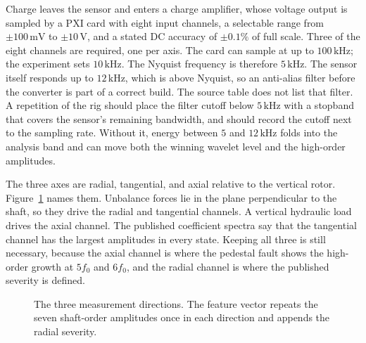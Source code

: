 Charge leaves the sensor and enters a charge amplifier, whose voltage output is sampled by a PXI card with eight input channels, a selectable range from \(\pm 100\,\mathrm{mV}\) to \(\pm 10\,\mathrm{V}\), and a stated DC accuracy of \(\pm 0.1\%\) of full scale.
Three of the eight channels are required, one per axis.
The card can sample at up to \(100\,\mathrm{kHz}\); the experiment sets \(10\,\mathrm{kHz}\).
The Nyquist frequency is therefore \(5\,\mathrm{kHz}\).
The sensor itself responds up to \(12\,\mathrm{kHz}\), which is above Nyquist, so an anti-alias filter before the converter is part of a correct build.
The source table does not list that filter.
A repetition of the rig should place the filter cutoff below \(5\,\mathrm{kHz}\) with a stopband that covers the sensor's remaining bandwidth, and should record the cutoff next to the sampling rate.
Without it, energy between \(5\) and \(12\,\mathrm{kHz}\) folds into the analysis band and can move both the winning wavelet level and the high-order amplitudes.

The three axes are radial, tangential, and axial relative to the vertical rotor.
Figure~\ref{fig:axes} names them.
Unbalance forces lie in the plane perpendicular to the shaft, so they drive the radial and tangential channels.
A vertical hydraulic load drives the axial channel.
The published coefficient spectra say that the tangential channel has the largest amplitudes in every state.
Keeping all three is still necessary, because the axial channel is where the pedestal fault shows the high-order growth at \(5f_{0}\) and \(6f_{0}\), and the radial channel is where the published severity is defined.

\begin{figure}[H]
\centering
{}
\caption{The three measurement directions. The feature vector repeats the seven shaft-order amplitudes once in each direction and appends the radial severity.}
\label{fig:axes}
\end{figure}

